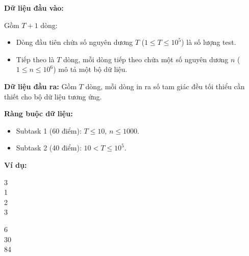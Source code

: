 \documentclass[12pt]{scrartcl}  %
\begin{document}
\textbf{Dữ liệu đầu vào:}

Gồm $T + 1$ dòng:
\begin{itemize}
    \item Dòng đầu tiên chứa số nguyên dương $T$ ($1 \leq T \leq 10^5$) là số lượng test.
    \item Tiếp theo là $T$ dòng, mỗi dòng tiếp theo chứa một số nguyên dương $n$ ($1 \leq n \leq 10^6$) mô tả một bộ dữ liệu.
\end{itemize}

\textbf{Dữ liệu đầu ra:}
Gồm $T$ dòng, mỗi dòng in ra số tam giác đều tối thiểu cần thiết cho bộ dữ liệu tương ứng.

\textbf{Ràng buộc dữ liệu:}

\begin{itemize}
    \item Subtask 1 (60 điểm): $T \le 10$, $n \leq 1000$.
    \item Subtask 2 (40 điểm): $10 < T \le 10^5 $.
\end{itemize}


\textbf{Ví dụ:}
\begin{tcolorbox}[colback=gray!5!white, colframe=blue!50!black, title=Input]
3\\
1\\
2\\
3
\end{tcolorbox}
\begin{tcolorbox}[colback=gray!5!white, colframe=green!50!black, title=Output]
6\\
30\\
84
\end{tcolorbox}
\end{document}
